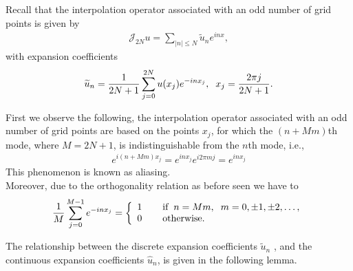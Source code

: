     Recall that the interpolation operator associated with an odd number of grid points is given by
    \begin{align*}
    	\mathcal{J}_{2N} u = \displaystyle \sum_{|n|\leq N} \widetilde{u}_n e^{inx},
    \end{align*}
    with expansion coefficients
    \begin{align*}
    	\widetilde{u}_n = \displaystyle \frac{1}{2N + 1} \sum^{2N}_{j=0} u(x_j)e^{-in x_j}, \hspace{2mm} x_j = \frac{2 \pi j}{2N+1}.
    \end{align*}
    
    First we observe the following, the interpolation operator associated with an odd number of grid points are based on the points $x_j$, for which the $(n + Mm)$th mode, where $M = 2N + 1$, is indistinguishable from  the $n$th mode, i.e.,
    \begin{align*}
    	e^{i(n + Mm)x_j} = e^{in x_j} e^{i 2 \pi m j} = e^{in x_j}
    \end{align*}
	This phenomenon is known as aliasing.\\
	
	Moreover, due to the orthogonality relation as before seen we have to
    \begin{align*}
    	\frac{1}{M} \displaystyle \sum^{M-1}_{j=0} e^{-inx_j} =  \left \lbrace \begin{array}{ll}
    	1 \hspace{4mm} &\text{if} \hspace{2mm} n=M m, \hspace{2mm} m = 0, \pm 1, \pm 2, \dots, \\
    	0 &\text{otherwise.}
    	\end{array}  \right .
    \end{align*} 
    
    The relationship between the discrete expansion coefficients $\widetilde{u}_n$ , and the continuous expansion coefficients $\hat{u}_n$, is given in the following lemma. 
    
